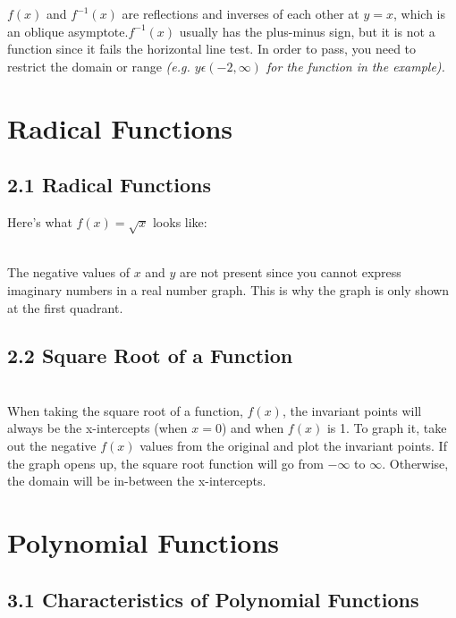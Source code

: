 \documentclass[12pt]{article}
\begin{document}
$f(x)$ and $f^{-1}(x)$ are reflections and inverses of each other at $y=x$, which is an oblique asymptote.$f^{-1}(x)$ usually has the plus-minus sign, but it is not a function since it fails the horizontal line test. In order to pass, you need to restrict the domain or range \textit{(e.g. $y\epsilon(-2, \infty)$ for the function in the example).}

\section{Radical Functions}
\subsection*{2.1 Radical Functions}

Here's what $f(x)=\sqrt{x}$ looks like:
\\
\begin{center}
\end{center}
\\
The negative values of $x$ and $y$ are not present since you cannot express imaginary numbers in a real number graph. This is why the graph is only shown at the first quadrant.
\subsection*{2.2 Square Root of a Function}
\\
When taking the square root of a function, $f(x)$, the invariant points will always be the x-intercepts (when $x=0$) and when $f(x)$ is 1. To graph it, take out the negative $f(x)$ values from the original and plot the invariant points. If the graph opens up, the square root function will go from $-\infty$ to $\infty$. Otherwise, the domain will be in-between the x-intercepts.

\section{Polynomial Functions}

\subsection*{3.1 Characteristics of Polynomial Functions}
\end{document}
